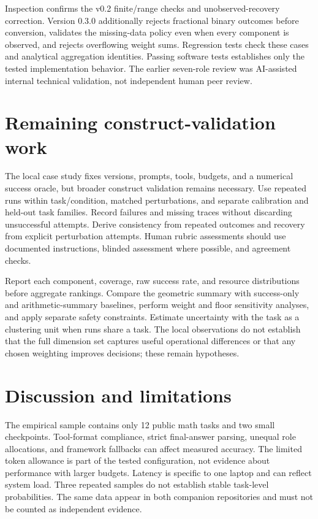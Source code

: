 \documentclass[11pt]{article}
\begin{document}
Inspection confirms the v0.2 finite/range checks and unobserved-recovery correction. Version 0.3.0 additionally rejects fractional binary outcomes before conversion, validates the missing-data policy even when every component is observed, and rejects overflowing weight sums. Regression tests check these cases and analytical aggregation identities. Passing software tests establishes only the tested implementation behavior. The earlier seven-role review was AI-assisted internal technical validation, not independent human peer review.

\section{Remaining construct-validation work}
The local case study fixes versions, prompts, tools, budgets, and a numerical success oracle, but broader construct validation remains necessary. Use repeated runs within task/condition, matched perturbations, and separate calibration and held-out task families. Record failures and missing traces without discarding unsuccessful attempts. Derive consistency from repeated outcomes and recovery from explicit perturbation attempts. Human rubric assessments should use documented instructions, blinded assessment where possible, and agreement checks.

Report each component, coverage, raw success rate, and resource distributions before aggregate rankings. Compare the geometric summary with success-only and arithmetic-summary baselines, perform weight and floor sensitivity analyses, and apply separate safety constraints. Estimate uncertainty with the task as a clustering unit when runs share a task. The local observations do not establish that the full dimension set captures useful operational differences or that any chosen weighting improves decisions; these remain hypotheses.

\section{Discussion and limitations}
The empirical sample contains only 12 public math tasks and two small checkpoints. Tool-format compliance, strict final-answer parsing, unequal role allocations, and framework fallbacks can affect measured accuracy. The limited token allowance is part of the tested configuration, not evidence about performance with larger budgets. Latency is specific to one laptop and can reflect system load. Three repeated samples do not establish stable task-level probabilities. The same data appear in both companion repositories and must not be counted as independent evidence.
\end{document}
